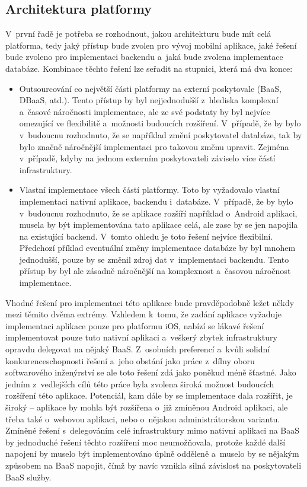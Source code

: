 \subsection{Architektura platformy}\label{platform-architecture}

V~první řadě je potřeba se rozhodnout, jakou architekturu bude mít celá platforma, tedy jaký přístup bude zvolen pro vývoj mobilní aplikace, jaké řešení bude zvoleno pro implementaci backendu a~jaká bude zvolena implementace databáze. Kombinace těchto řešení lze seřadit na stupnici, která má dva konce:
\begin{itemize}
\item Outsourcování co největší části platformy na externí poskytovale (BaaS, DBaaS, atd.). Tento přístup by byl nejjednodušší z~hlediska komplexní a~časové náročnosti implementace, ale ze své podstaty by byl nejvíce omezující ve flexibilitě a~možnosti budoucích rozšíření. V~případě, že by bylo v~budoucnu rozhodnuto, že se například změní poskytovatel databáze, tak by bylo značně náročnější implementaci pro takovou změnu upravit. Zejména v~případě, kdyby na jednom externím poskytovateli záviselo více částí infrastruktury.
\item Vlastní implementace všech částí platformy. Toto by vyžadovalo vlastní implementaci nativní aplikace, backendu i~databáze. V~případě, že by bylo v~budoucnu rozhodnuto, že se aplikace rozšíří například o~Android aplikaci, musela by být implementována tato aplikace celá, ale zase by se jen napojila na existující backend. V~tomto ohledu je toto řešení nejvíce flexibilní. Předchozí příklad eventuální změny implementace databáze by byl mnohem jednodušší, pouze by se změnil zdroj dat v~implementaci backendu. Tento přístup by byl ale zásadně náročnější na komplexnost a~časovou náročnost implementace. 
\end{itemize}

Vhodné řešení pro implementaci této aplikace bude pravděpodobně ležet někdy mezi těmito dvěma extrémy. Vzhledem k~tomu, že zadání aplikace vyžaduje implementaci aplikace pouze pro platformu iOS, nabízí se lákavé řešení implementovat pouze tuto nativní aplikaci a~veškerý zbytek infrastruktury opravdu delegovat na nějaký BaaS. Z~osobních preferencí a~kvůli solidní konkurenceschopnosti řešení a~jeho obstání jako práce z~dílny oboru softwarového inženýrství se ale toto řešení zdá jako poněkud méně šťastné. Jako jedním z~vedlejších cílů této práce byla zvolena široká možnost budoucích rozšíření této aplikace. Potenciál, kam dále by se implementace dala rozšířit, je široký – aplikace by mohla být rozšířena o~již zmíněnou Android aplikaci, ale třeba také o~webovou aplikaci, nebo o~nějakou administrátorskou variantu. Zmíněné řešení s~delegováním celé infrastruktury mimo nativní aplikaci na BaaS by jednoduché řešení těchto rozšíření moc neumožňovala, protože každé další napojení by muselo být implementováno úplně odděleně a~muselo by se nějakým způsobem na BaaS napojit, čímž by navíc vznikla silná závislost na poskytovateli BaaS služby.

